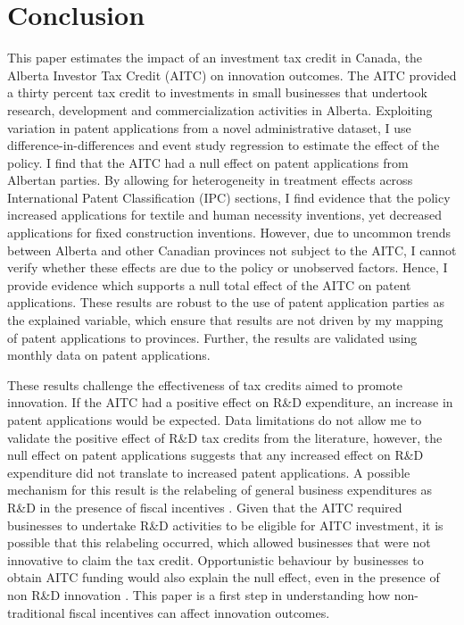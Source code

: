 \documentclass[../main.tex]{subfiles}
\begin{document}
\section{Conclusion}
\label{sec:conclusions}

This paper estimates the impact of an investment tax credit in Canada, the Alberta Investor Tax Credit (AITC) on innovation outcomes. The AITC provided a thirty percent tax credit to investments in small businesses that undertook research, development and commercialization activities in Alberta. Exploiting variation in patent applications from a novel administrative dataset, I use difference-in-differences and event study regression to estimate the effect of the policy. I find that the AITC had a null effect on patent applications from Albertan parties. By allowing for heterogeneity in treatment effects across International Patent Classification (IPC) sections, I find evidence that the policy increased applications for textile and human necessity inventions, yet decreased applications for fixed construction inventions. However, due to uncommon trends between Alberta and other Canadian provinces not subject to the AITC, I cannot verify whether these effects are due to the policy or unobserved factors. Hence, I provide evidence which supports a null total effect of the AITC on patent applications. These results are robust to the use of patent application parties as the explained variable, which ensure that results are not driven by my mapping of patent applications to provinces. Further, the results are validated using monthly data on patent applications. 

These results challenge the effectiveness of tax credits aimed to promote innovation. If the AITC had a positive effect on R\&D expenditure, an increase in patent applications would be expected. Data limitations do not allow me to validate the positive effect of R\&D tax credits from the literature, however, the null effect on patent applications suggests that any increased effect on R\&D expenditure did not translate to increased patent applications. A possible mechanism for this result is the relabeling of general business expenditures as R\&D in the presence of fiscal incentives \parencite{chen_etal21}. Given that the AITC required businesses to undertake R\&D activities to be eligible for AITC investment, it is possible that this relabeling occurred, which allowed businesses that were not innovative to claim the tax credit. Opportunistic behaviour by businesses to obtain AITC funding would also explain the null effect, even in the presence of non R\&D innovation \parencite{xie_etal19}. This paper is a first step in understanding how non-traditional fiscal incentives can affect innovation outcomes. 
\end{document}
